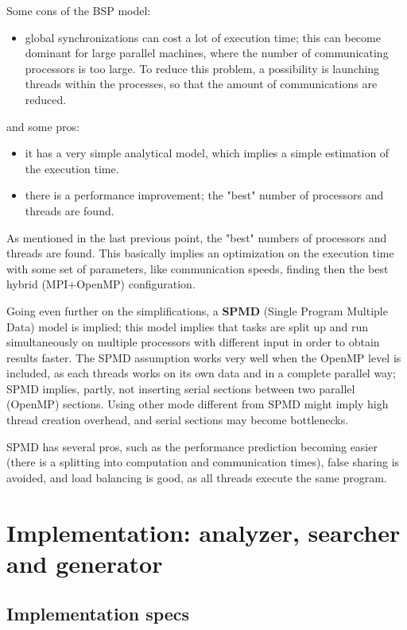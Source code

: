 \documentclass[paper=a4, fontsize=11pt]{scrartcl} %
\numberwithin{equation}{section} %
\numberwithin{figure}{section} %
\numberwithin{table}{section} %
\begin{document}
Some cons of the BSP model:

\begin{itemize}
\item global synchronizations can cost a lot of execution time; this can become dominant for large parallel machines, where the number of communicating processors is too large. To reduce this problem, a possibility is launching threads within the processes, so that the amount of communications are reduced.
\end{itemize}

and some pros:

\begin{itemize}
\item it has a very simple analytical model, which implies a simple estimation of the execution time.
\item there is a performance improvement; the "best" number of processors and threads are found.
\end{itemize}

As mentioned in the last previous point, the "best" numbers of processors and threads are found. This basically implies an optimization on the execution time with some set of parameters, like communication speeds, finding then the best hybrid (MPI+OpenMP) configuration.

Going even further on the simplifications, a \textbf {SPMD} (Single Program Multiple Data) model is implied; this model implies that tasks are split up and run simultaneously on multiple processors with different input in order to obtain results faster. The SPMD assumption works very well when the OpenMP level is included, as each threads works on its own data and in a complete parallel way; SPMD implies, partly, not inserting serial sections between two parallel (OpenMP) sections. Using other mode different from SPMD might imply high thread creation overhead, and serial sections may become bottlenecks.

SPMD has several pros, such as the performance prediction becoming easier (there is a splitting into computation and communication times), false sharing is avoided, and load balancing is good, as all threads execute the same program.


\section{Implementation: analyzer, searcher and generator}

\subsection{Implementation specs}
\end{document}
